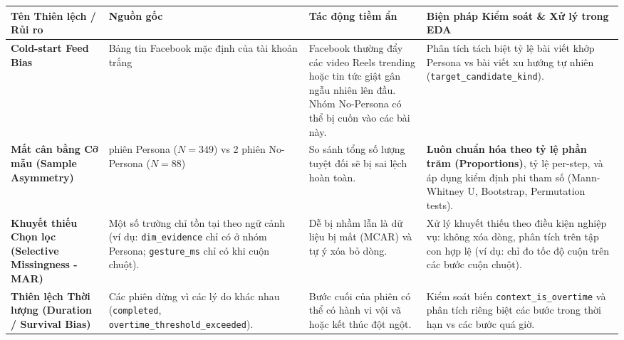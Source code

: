 \documentclass[11pt]{article}
\newcounter{none}
\begin{document}
{\def\LTcaptype{none} %
\begin{longtable}[]{@{}
  >{\raggedright\arraybackslash}p{}
  >{\raggedright\arraybackslash}p{}
  >{\raggedright\arraybackslash}p{}
  >{\raggedright\arraybackslash}p{}@{}}
\toprule\noalign{}
\begin{minipage}[b]{\linewidth}\raggedright
Tên Thiên lệch / Rủi ro
\end{minipage} & \begin{minipage}[b]{\linewidth}\raggedright
Nguồn gốc
\end{minipage} & \begin{minipage}[b]{\linewidth}\raggedright
Tác động tiềm ẩn
\end{minipage} & \begin{minipage}[b]{\linewidth}\raggedright
Biện pháp Kiểm soát \& Xử lý trong EDA
\end{minipage} \\
\midrule\noalign{}
\endhead
\bottomrule\noalign{}
\endlastfoot
\textbf{Cold-start Feed Bias} & Bảng tin Facebook mặc định của tài khoản
trắng & Facebook thường đẩy các video Reels trending hoặc tin tức giật
gân ngẫu nhiên lên đầu. Nhóm No-Persona có thể bị cuốn vào các bài này.
& Phân tích tách biệt tỷ lệ bài viết khớp Persona vs bài viết xu hướng
tự nhiên (\texttt{target\_candidate\_kind}). \\
\textbf{Mất cân bằng Cỡ mẫu (Sample Asymmetry)} & 6 phiên Persona
(\(N=349\)) vs 2 phiên No-Persona (\(N=88\)) & So sánh tổng số lượng
tuyệt đối sẽ bị sai lệch hoàn toàn. & \textbf{Luôn chuẩn hóa theo tỷ lệ
phần trăm (Proportions)}, tỷ lệ per-step, và áp dụng kiểm định phi tham
số (Mann-Whitney U, Bootstrap, Permutation tests). \\
\textbf{Khuyết thiếu Chọn lọc (Selective Missingness - MAR)} & Một số
trường chỉ tồn tại theo ngữ cảnh (ví dụ: \texttt{dim\_evidence} chỉ có ở
nhóm Persona; \texttt{gesture\_ms} chỉ có khi cuộn chuột). & Dễ bị nhầm
lẫn là dữ liệu bị mất (MCAR) và tự ý xóa bỏ dòng. & Xử lý khuyết thiếu
theo điều kiện nghiệp vụ: không xóa dòng, phân tích trên tập con hợp lệ
(ví dụ: chỉ đo tốc độ cuộn trên các bước cuộn chuột). \\
\textbf{Thiên lệch Thời lượng (Duration / Survival Bias)} & Các phiên
dừng vì các lý do khác nhau (\texttt{completed},
\texttt{overtime\_threshold\_exceeded}). & Bước cuối của phiên có thể có
hành vi vội vã hoặc kết thúc đột ngột. & Kiểm soát biến
\texttt{context\_is\_overtime} và phân tích riêng biệt các bước trong
thời hạn vs các bước quá giờ. \\
\end{longtable}
}
\end{document}
